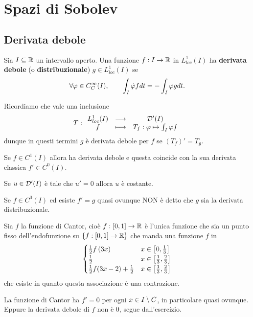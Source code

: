 \chapter{Spazi di Sobolev}

\section{Derivata debole}
\begin{definition}
Sia $I\subseteq \mathbb{R}$ un intervallo aperto. Una funzione $f:I\to \mathbb{R}$ in $L^1_{loc}(I)$ ha \textbf{derivata debole} (o \textbf{distribuzionale}) $g\in L^1_{loc}(I)$ se
\[\forall \varphi\in C^\infty_C(I),\qquad \int_I\dot{\varphi} fdt=-\int_I\varphi gdt.\]
\end{definition}

\begin{remark}
Ricordiamo che vale una inclusione
\[T:\begin{array}{ccc} {L^1_{loc}(I)} & \longrightarrow & {\mathcal{D}'(I)}\\ {f} & \longmapsto & {T_f:\varphi\mapsto \int_I\varphi f} \end{array}\]
dunque in questi termini $g$ \`e derivata debole per $f$ se $(T_f)'=T_g$.
\end{remark}


\begin{remark}
Se $f\in C^1(I)$ allora ha derivata debole e questa coincide con la sua derivata classica $f'\in C^0(I)$.
\end{remark}

\begin{exercise}
Se $u\in \mathcal{D}'(I)$ \`e tale che $u'=0$ allora $u$ \`e costante.
\end{exercise}

\begin{remark}
Se $f\in C^0(I)$ ed esiste $f'=g$ quasi ovunque NON \`e detto che $g$ sia la derivata distribuzionale.
\end{remark}

\begin{example}
Sia $f$ la funzione di Cantor, cio\`e $f:[0,1]\to \mathbb{R}$ \`e l'unica funzione che sia un punto fisso dell'endofunzione su $\left\{{f:[0,1]\to\mathbb{R}}\right\}$ che manda una funzione $f$ in
\[\begin{cases}
\frac12f\left({3x}\right) &x\in \left[{0,\frac13}\right]\\
\frac12 &x\in \left[{\frac13,\frac23}\right]\\
\frac12f(3x-2)+\frac12  &x\in \left[{\frac13,\frac23}\right]
\end{cases}\] 
che esiste in quanto questa associazione \`e una contrazione.

La funzione di Cantor ha $f'=0$ per ogni $x\in I\setminus C$, in particolare quasi ovunque. Eppure la derivata debole di $f$ non \`e $0$, segue dall'esercizio.
\end{example}

